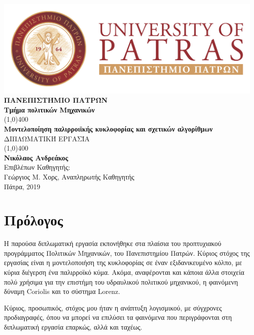 \documentclass[12pt, a4paper, oneside]{extarticle}
\numberwithin{equation}{subsection}
\def\lat#1{\textlatin{#1}}
\newcommand{\theauthor}{Νικόλαος Ανδρεάκος\xspace}
\newcommand{\thetitle}{Μοντελοποίηση παλιρροιϊκής κυκλοφορίας και σχετικών αλγορίθμων\xspace}
\newcommand{\thedate}{Πάτρα, 2019\xspace}
\newcommand{\tmima}{Τμήμα πολιτικών Μηχανικών\xspace}
\newcommand{\proff}{Γεώργιος Μ. Χορς\xspace}
\newcommand{\proffrole}{Αναπληρωτής Καθηγητής\xspace}
\newenvironment{ComputerFont}{\fontfamily{cmr}\selectfont}{\par}
\begin{document}
	\sloppy
	\begin{ComputerFont}
		\begin{titlepage}
			\begin{center}
				\includegraphics[scale=0.4]{logo_pp}\\
				\Large{\MakeUppercase{\textbf{Πανεπιστήμιο Πατρών}}}\\
				\Large{\textbf{\tmima}}\\
				\vfill
				\line(1,0){400}\\[1mm]
				\LARGE{{\textbf{\thetitle}}}\\[3mm]
				\Large{\MakeUppercase{{Διπλωματική Εργασία}}}\\[1mm]
				\line(1,0){400}\\
				\vfill
				\textbf{\Large{\theauthor}}\\[2mm]
				Επιβλέπων Καθηγητής:\\
				\proff, \proffrole \\
				\vfill
				\thedate \\
			\end{center}
		\end{titlepage}
	\end{ComputerFont}

	\section*{Πρόλογος}
		\thispagestyle{pagenum}
		Η παρούσα διπλωματική εργασία εκπονήθηκε στα πλαίσια του προπτυχιακού προγράμματος Πολιτικών Μηχανικών, του Πανεπιστημίου Πατρών. Κύριος στόχος της εργασίας είναι η μοντελοποιήση της κυκλοφορίας σε έναν εξιδανικευμένο κόλπο, με κύρια διέγερση ένα παλιρροϊκό κύμα. Ακόμα, αναφέρονται και κάποια άλλα στοιχεία πολύ χρήσιμα για την επιστήμη του υδραυλικού πολιτικού μηχανικού, η φαινόμενη δύναμη \lat{Coriolis} και το σύστημα \lat{Lorenz}.

		Κύριος, προσωπικός, στόχος μου ήταν η ανάπτυξη λογισμικού, με σύγχρονες προδιαγραφές, όπου να μπορεί να επιλύσει τα φαινόμενα που περιγράφονται στη διπλωματική εργασία επαρκώς, αλλά και ταχέως.
\end{document}
